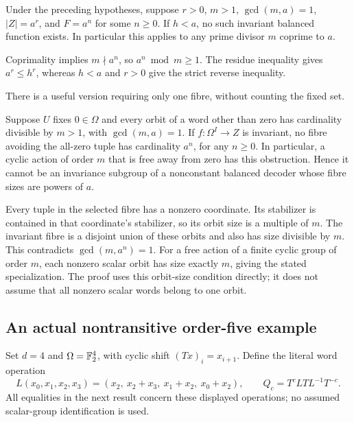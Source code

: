 \begin{corollary}
\label{cor:few-fixed-words}
Under the preceding hypotheses, suppose $r>0$, $m>1$,
$\gcd(m,a)=1$, $|Z|=a^r$, and $F=a^n$ for some $n\ge0$.
If $h<a$, no such invariant balanced function exists.
In particular this applies to any prime divisor $m$ coprime to $a$.
\end{corollary}
\begin{outline}
Coprimality implies $m\nmid a^n$, so $a^n\bmod m\ge1$.
The residue inequality gives $a^r\le h^r$, whereas $h<a$ and
$r>0$ give the strict reverse inequality.
\end{outline}

There is a useful version requiring only one fibre, without counting
the fixed set.

\begin{proposition}
\label{prop:semiregular-balance}
Suppose $U$ fixes $0\in\Omega$ and every orbit of a word other than
zero has cardinality divisible by $m>1$, with $\gcd(m,a)=1$.
If $f\colon\Omega^I\to Z$ is invariant, no fibre avoiding the
all-zero tuple has cardinality $a^n$, for any $n\ge0$.
In particular, a cyclic action of order $m$ that is free away from zero
has this obstruction.  Hence it cannot be an invariance subgroup of a
nonconstant balanced decoder whose fibre sizes are powers of $a$.
\end{proposition}
\begin{outline}
Every tuple in the selected fibre has a nonzero coordinate.  Its
stabilizer is contained in that coordinate's stabilizer, so its orbit
size is a multiple of $m$.  The invariant fibre is a disjoint union of
these orbits and also has size divisible by $m$.  This contradicts
$\gcd(m,a^n)=1$.  For a free action of a finite cyclic group of order
$m$, each nonzero scalar orbit has size exactly $m$, giving the stated
specialization.  The proof uses this orbit-size condition directly; it
does not assume that all nonzero scalar words belong to one orbit.
\end{outline}

\subsection{An actual nontransitive order-five example}

Set $d=4$ and $\Omega=\mathbb{F}_2^4$, with cyclic shift
$(Tx)_i=x_{i+1}$.  Define the literal word operation
\[
 L(x_0,x_1,x_2,x_3)
   =(x_2,\ x_2+x_3,\ x_1+x_2,\ x_0+x_2),
 \qquad Q_c=T^cLTL^{-1}T^{-c}.
\]
All equalities in the next result concern these displayed operations;
no assumed scalar-group identification is used.

